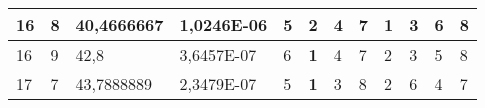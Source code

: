 \documentclass[conference]{IEEEtran}
\begin{document}
\begin{table*}[]
\begin{tabular}{|llll|llllllll|}
\multicolumn{1}{|l|}{16}                                                    & \multicolumn{1}{l|}{8}                                                        & \multicolumn{1}{l|}{40,4666667}                                                   & 1,0246E-06                     & \multicolumn{1}{l|}{5}                                                  & \multicolumn{1}{l|}{2}                                                  & \multicolumn{1}{l|}{4}                                                  & \multicolumn{1}{l|}{7}                                                  & \multicolumn{1}{l|}{\textbf{1}}                                         & \multicolumn{1}{l|}{3}                                                  & \multicolumn{1}{l|}{6}                                                  & 8                          \\ \hline
\multicolumn{1}{|l|}{16}                                                    & \multicolumn{1}{l|}{9}                                                        & \multicolumn{1}{l|}{42,8}                                                         & 3,6457E-07                     & \multicolumn{1}{l|}{6}                                                  & \multicolumn{1}{l|}{\textbf{1}}                                         & \multicolumn{1}{l|}{4}                                                  & \multicolumn{1}{l|}{7}                                                  & \multicolumn{1}{l|}{2}                                                  & \multicolumn{1}{l|}{3}                                                  & \multicolumn{1}{l|}{5}                                                  & 8                          \\ \hline
\multicolumn{1}{|l|}{17}                                                    & \multicolumn{1}{l|}{7}                                                        & \multicolumn{1}{l|}{43,7888889}                                                   & 2,3479E-07                     & \multicolumn{1}{l|}{5}                                                  & \multicolumn{1}{l|}{\textbf{1}}                                         & \multicolumn{1}{l|}{3}                                                  & \multicolumn{1}{l|}{8}                                                  & \multicolumn{1}{l|}{2}                                                  & \multicolumn{1}{l|}{6}                                                  & \multicolumn{1}{l|}{4}                                                  & 7                          \\ \hline

\end{tabular}
\end{table*}
\end{document}
